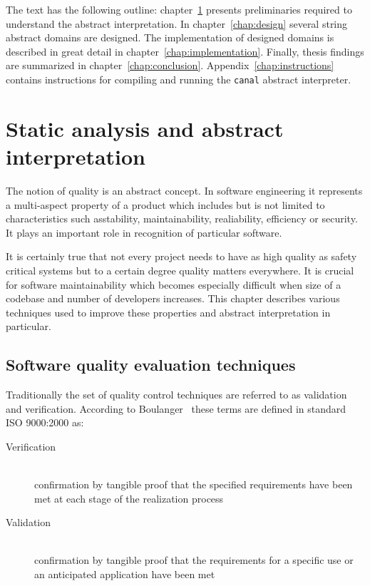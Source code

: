 \documentclass[12pt,final,oneside]{fithesis2}
\begin{document}
The text has the following outline: chapter~\ref{chap:preliminaries}
presents preliminaries required to understand the abstract interpretation.
In chapter~\ref{chap:design} several string abstract domains are designed.
The implementation of designed domains is described in great detail in
chapter~\ref{chap:implementation}. Finally, thesis findings are summarized
in chapter~\ref{chap:conclusion}. Appendix~\ref{chap:instructions} contains
instructions for compiling and running the \texttt{canal} abstract
interpreter.


\chapter{Static analysis and abstract interpretation}
\label{chap:preliminaries}

The notion of quality is an abstract concept. In software engineering it
represents a multi-aspect property of a product which includes but is not
limited to characteristics such asstability, maintainability, realiability,
efficiency or security. It plays an important role in recognition of
particular software.

It is certainly true that not every project needs to have as high quality as
safety critical systems but to a certain degree quality matters
everywhere. It is crucial for software maintainability which becomes
especially difficult when size of a codebase and number of developers
increases. This chapter describes various techniques used to
improve these properties and abstract interpretation in particular.


\section{Software quality evaluation techniques}

Traditionally the set of quality control techniques are referred to as
validation and verification. According to
Boulanger~\cite{Boulanger12-1} these terms are defined in standard
ISO 9000:2000 as:

\begin{description}

\item[Verification] \hfill \\
confirmation by tangible proof that the specified requirements have
been met at each stage of the realization process

\item[Validation] \hfill \\
confirmation by tangible proof that the requirements for a specific use or
an anticipated application have been met

\end{description}
\end{document}
